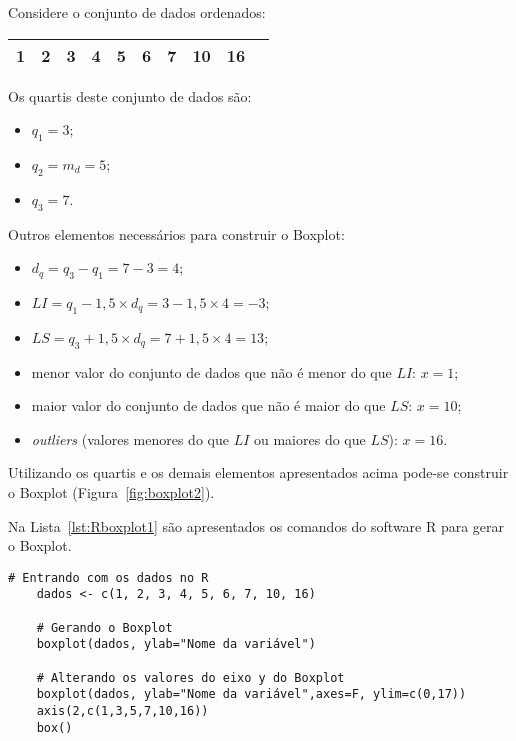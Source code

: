 \documentclass[11pt,fleqn]{book} %
\begin{document}
\begin{example}

Considere o conjunto de dados ordenados:

\begin{center}
	\begin{tabular}{c c c c c c c c c c}
	\hline
	1 & 2 & \textcolor{ocre}{\bf 3} & 4 & \textcolor{ocre}{\bf 5} & 6 & \textcolor{ocre}{\bf 7} & 10 & 16 \\
	\hline
	\end{tabular}
\end{center}

Os quartis deste conjunto de dados são:

\begin{itemize}
\item $q_1=3$;
\item $q_2=m_d=5$;
\item $q_3=7$. \\
\end{itemize}

Outros elementos necessários para construir o Boxplot:

\begin{itemize}
\item $d_q=q_3-q_1=7-3=4$;
\item $LI=q_1-1,5 \times d_q=3-1,5 \times 4=-3$;
\item $LS=q_3+1,5 \times d_q=7+1,5 \times 4=13$;
\item menor valor do conjunto de dados que não é menor do que $LI: \, x=1$;
\item maior valor do conjunto de dados que não é maior do que $LS: \, x=10$;
\item {\itshape outliers} (valores menores do que $LI$ ou maiores do que $LS$): $x=16$. \\
\end{itemize}

Utilizando os quartis e os demais elementos apresentados acima pode-se construir o Boxplot (Figura~\ref{fig:boxplot2}).

\end{example}

\vspace{0,5cm}

Na Lista~\ref{lst:Rboxplot1} são apresentados os comandos do software R para gerar o Boxplot. \\

\begin{scriptsize}
	\estiloR
	\begin{lstlisting}[caption={Comandos do software R}, label=lst:Rboxplot1]
	# Entrando com os dados no R
	dados <- c(1, 2, 3, 4, 5, 6, 7, 10, 16)

	# Gerando o Boxplot
	boxplot(dados, ylab="Nome da variável")
	
	# Alterando os valores do eixo y do Boxplot
	boxplot(dados, ylab="Nome da variável",axes=F, ylim=c(0,17))
	axis(2,c(1,3,5,7,10,16))
	box()

	\end{lstlisting}
\end{scriptsize}
\end{document}
